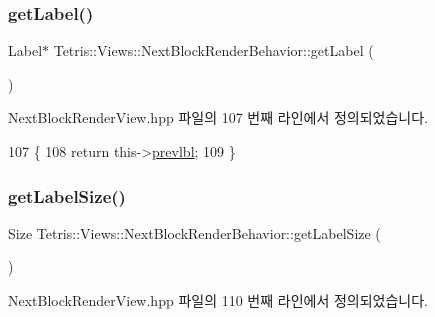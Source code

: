 \subsubsection{\texorpdfstring{get\+Label()}{getLabel()}}
{\footnotesize\ttfamily Label$\ast$ Tetris\+::\+Views\+::\+Next\+Block\+Render\+Behavior\+::get\+Label (\begin{DoxyParamCaption}{ }\end{DoxyParamCaption})\hspace{0.3cm}{\ttfamily [inline]}}



Next\+Block\+Render\+View.\+hpp 파일의 107 번째 라인에서 정의되었습니다.


\begin{DoxyCode}
107                              \{
108                 \textcolor{keywordflow}{return} this->\hyperlink{class_tetris_1_1_views_1_1_next_block_render_behavior_afc0dbfd7dbdf66e88a804a109b470546}{prevlbl};
109             \}
\end{DoxyCode}
\mbox{\label{class_tetris_1_1_views_1_1_next_block_render_behavior_a5eb782a4171baf98f967d5a048cfe243}} 
\subsubsection{\texorpdfstring{get\+Label\+Size()}{getLabelSize()}}
{\footnotesize\ttfamily Size Tetris\+::\+Views\+::\+Next\+Block\+Render\+Behavior\+::get\+Label\+Size (\begin{DoxyParamCaption}{ }\end{DoxyParamCaption})\hspace{0.3cm}{\ttfamily [inline]}}



Next\+Block\+Render\+View.\+hpp 파일의 110 번째 라인에서 정의되었습니다.


